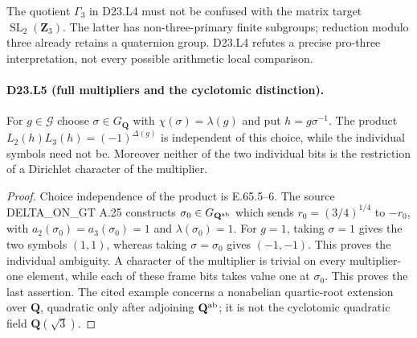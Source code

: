 The quotient $\Gamma_3$ in D23.L4 must not be confused with the
matrix target $\operatorname{SL}_2(\mathbf Z_3)$. The latter has
non-three-primary finite subgroups; reduction modulo three already
retains a quaternion group. D23.L4 refutes a precise pro-three
interpretation, not every possible arithmetic local comparison.

\paragraph{D23.L5 (full multipliers and the cyclotomic distinction).}
For $g\in\mathcal G$ choose $\sigma\in G_{\mathbf Q}$ with
$\chi(\sigma)=\lambda(g)$ and put $h=g\sigma^{-1}$.
The product $L_2(h)L_3(h)=(-1)^{\Delta(g)}$ is independent of this
choice, while the individual symbols need not be. Moreover neither
of the two individual bits is the restriction of a Dirichlet
character of the multiplier.
\begin{proof}
Choice independence of the product is E.65.5--6. The source
DELTA\_ON\_GT A.25 constructs $\sigma_0\in G_{\mathbf Q^{\rm ab}}$
which sends $r_0=(3/4)^{1/4}$ to $-r_0$, with
$a_2(\sigma_0)=a_3(\sigma_0)=1$ and $\lambda(\sigma_0)=1$.
For $g=1$, taking $\sigma=1$ gives the two symbols $(1,1)$,
whereas taking $\sigma=\sigma_0$ gives $(-1,-1)$. This proves
the individual ambiguity. A character of the multiplier is
trivial on every multiplier-one element, while each of these
frame bits takes value one at $\sigma_0$. This proves the last
assertion. The cited example concerns a nonabelian quartic-root
extension over $\mathbf Q$, quadratic only after adjoining
$\mathbf Q^{\rm ab}$; it is not the cyclotomic quadratic field
$\mathbf Q(\sqrt3)$.
\end{proof}
